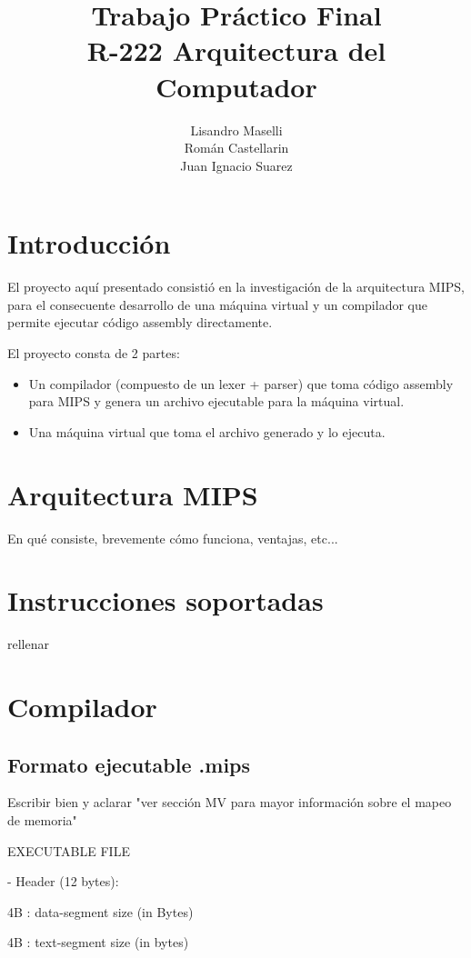 \documentclass[12pt]{article}
\begin{document}
\title{
Trabajo Práctico Final \\
\large R-222 Arquitectura del Computador}
\author{ Lisandro Maselli\\
Román Castellarin\\
Juan Ignacio Suarez}
\maketitle
\section{Introducción}
El proyecto aquí presentado consistió en la investigación de la arquitectura MIPS, para el consecuente desarrollo de una máquina virtual y un compilador que permite ejecutar código assembly directamente.

El proyecto consta de 2 partes:
\begin{itemize}
\item Un compilador (compuesto de un lexer + parser) que toma código assembly para MIPS y genera un archivo ejecutable para la máquina virtual.
\item Una máquina virtual que toma el archivo generado y lo ejecuta.
\end{itemize}    

\section{Arquitectura MIPS}
En qué consiste, brevemente cómo funciona, ventajas, etc...
\section{Instrucciones soportadas}
rellenar
    
\section{Compilador}
\subsection{Formato ejecutable .mips}
Escribir bien y aclarar "ver sección MV para mayor información sobre el mapeo de memoria" 

EXECUTABLE FILE

- Header (12 bytes):

    4B : data-segment size (in Bytes)

    4B : text-segment size (in bytes)
\end{document}
